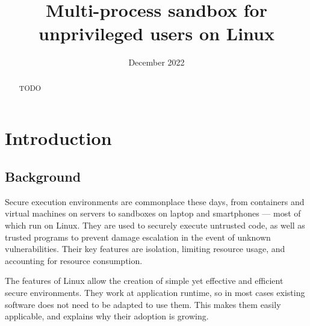 \documentclass[en]{pracamgr}
\title{Multi-process sandbox for unprivileged users on Linux}
\date{December 2022}
\begin{document}
\renewcommand\textfraction{0}

\maketitle

\begin{abstract}
TODO
\iffalse
We introduce a new sandbox for unprivileged Linux users that requires no kernel modifications. It takes advantage of several Linux mechanisms used elsewhere --- cgroups, namespaces, ptrace and seccomp among others. The sandbox was optimized to run dozens of untrusted programs in a sequence with minimal overhead while preserving the safety. It is capable of running both multi-threaded and multi-process programs. It is able to record the peek memory usage and CPU execution time of multithreaded program, alas these statistics are unavailable for multi-process programs.
We describe the encountered limitation and challenges around enforcing safety and collecting statistics. Further, we examine its ability to run complex multi-process programs like C++ compiler and the overhead when running a series of short-running programs.
\fi
\end{abstract}

\tableofcontents

\chapter{Introduction}\label{chapter:introduction}

\section{Background}

Secure execution environments are commonplace these days, from containers and virtual machines on servers to sandboxes on laptop and smartphones --- most of which run on Linux. They are used to securely execute untrusted code, as well as trusted programs to prevent damage escalation in the event of unknown vulnerabilities. Their key features are isolation, limiting resource usage, and accounting for resource consumption.

The features of Linux allow the creation of simple yet effective and efficient secure environments. They work at application runtime, so in most cases existing software does not need to be adapted to use them. This makes them easily applicable, and explains why their adoption is growing.
\end{document}
